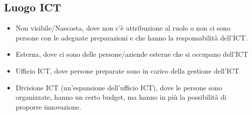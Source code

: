 \subsection{Luogo ICT}
\begin{itemize}
	\item Non visibile/Nascosta, dove non c'\`e attribuzione al ruolo o non ci sono persone con le adeguate preparazioni e che hanno la responsabilit\`a dell'ICT.
	\item Esterna, dove ci sono delle persone/aziende esterne che si occupano dell'ICT
	\item Ufficio ICT, dove persone preparate sono in carico della gestione dell'ICT
	\item Divisione ICT (un'espansione dell'ufficio ICT), dove le persone sono organizzate, hanno un certo budget, ma hanno in pi\`u la possibilit\`a di proporre innovazione.
\end{itemize}
